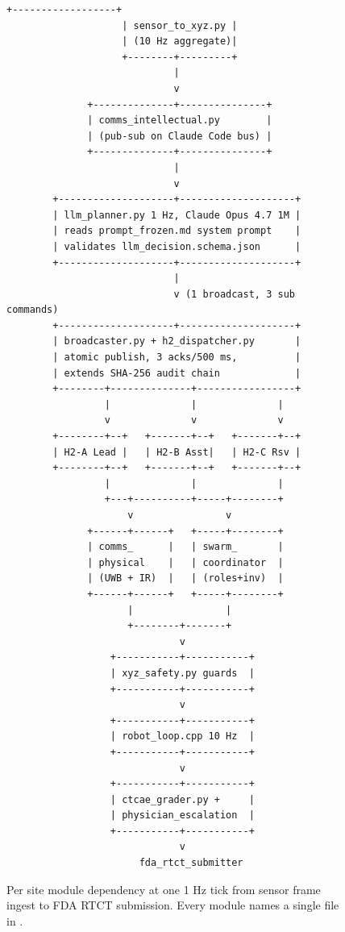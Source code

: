 \begin{sectionaccent}
\begin{figure}[H]
\begin{Verbatim}[fontsize=\footnotesize]
                    +------------------+
                    | sensor_to_xyz.py |
                    | (10 Hz aggregate)|
                    +--------+---------+
                             |
                             v
              +--------------+---------------+
              | comms_intellectual.py        |
              | (pub-sub on Claude Code bus) |
              +--------------+---------------+
                             |
                             v
        +--------------------+--------------------+
        | llm_planner.py 1 Hz, Claude Opus 4.7 1M |
        | reads prompt_frozen.md system prompt    |
        | validates llm_decision.schema.json      |
        +--------------------+--------------------+
                             |
                             v (1 broadcast, 3 sub commands)
        +--------------------+--------------------+
        | broadcaster.py + h2_dispatcher.py       |
        | atomic publish, 3 acks/500 ms,          |
        | extends SHA-256 audit chain             |
        +--------+--------------+-----------------+
                 |              |              |
                 v              v              v
        +--------+--+   +-------+--+   +-------+--+
        | H2-A Lead |   | H2-B Asst|   | H2-C Rsv |
        +--------+--+   +-------+--+   +-------+--+
                 |              |              |
                 +---+----------+-----+--------+
                     v                v
              +------+------+   +-----+--------+
              | comms_      |   | swarm_       |
              | physical    |   | coordinator  |
              | (UWB + IR)  |   | (roles+inv)  |
              +------+------+   +-----+--------+
                     |                |
                     +--------+-------+
                              v
                  +-----------+-----------+
                  | xyz_safety.py guards  |
                  +-----------+-----------+
                              v
                  +-----------+-----------+
                  | robot_loop.cpp 10 Hz  |
                  +-----------+-----------+
                              v
                  +-----------+-----------+
                  | ctcae_grader.py +     |
                  | physician_escalation  |
                  +-----------+-----------+
                              v
                       fda_rtct_submitter
\end{Verbatim}
\caption{Per site module dependency at one 1 Hz tick from sensor frame ingest to FDA RTCT submission. Every module names a single file in .}
\label{fig:module-dependency}
\end{figure}


\end{sectionaccent}
